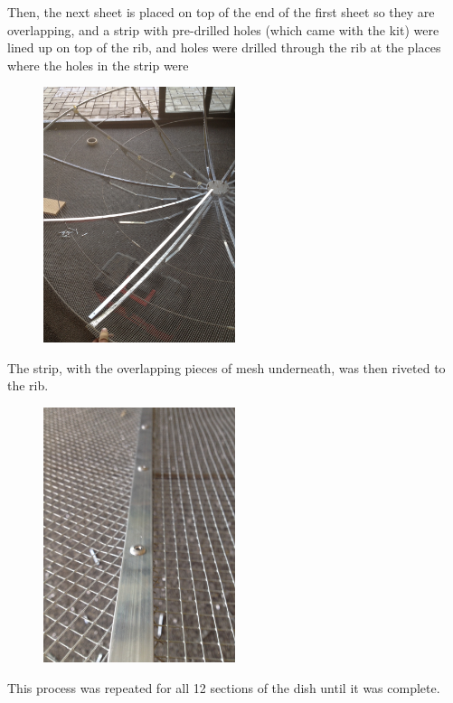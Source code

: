 \documentclass[11pt]{article} %
\begin{document}
Then, the next sheet is placed on top of the end of the first sheet so they are overlapping, and a strip with pre-drilled holes (which came with the kit) were lined up on top of the rib, and holes were drilled through the rib at the places where the holes in the strip were

\begin{figure}
  \centering
  \caption{   }
  \includegraphics[width=0.50\textwidth]{dish/14.jpeg}
\end{figure}

The strip, with the overlapping pieces of mesh underneath, was then riveted to the rib.

\begin{figure}
  \centering
  \caption{   }
  \includegraphics[width=0.50\textwidth]{dish/15.jpeg}
\end{figure}


This process was repeated for all 12 sections of the dish until it was complete.
\end{document}
